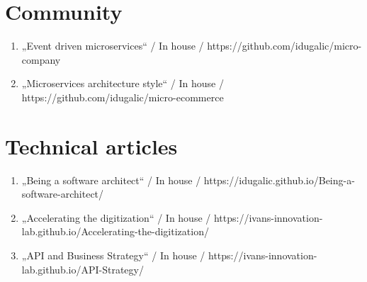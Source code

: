 \section*{Community}
\begin{enumerate}[label=,leftmargin=0cm,itemsep=10pt]
\item „Event driven microservices“ / In house / https://github.com/idugalic/micro-company
\item „Microservices architecture style“ / In house / https://github.com/idugalic/micro-ecommerce
\end{enumerate}

\section*{Technical articles}
\begin{enumerate}[label=,leftmargin=0cm,itemsep=10pt]
\item „Being a software architect“ / In house / https://idugalic.github.io/Being-a-software-architect/
\item „Accelerating the digitization“ / In house / https://ivans-innovation-lab.github.io/Accelerating-the-digitization/
\item „API and Business Strategy“ / In house / https://ivans-innovation-lab.github.io/API-Strategy/
\end{enumerate}
